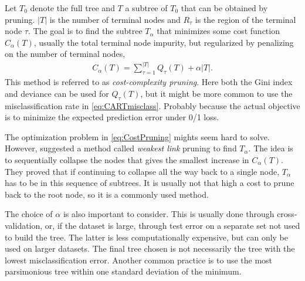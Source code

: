 Let $T_0$ denote the full tree and $T$ a subtree of $T_0$ that can be obtained by pruning. $|T|$ is the number of terminal nodes and $R_{\tau}$ is the region of the terminal node $\tau$. The goal is to find the subtree $T_\alpha$ that minimizes some cost function $C_\alpha (T)$, usually the total terminal node impurity, but regularized by penalizing on the number of terminal nodes,
\begin{align}
  \label{eq:CostPruning} 
  C_\alpha (T) = \sum_{\tau = 1}^{|T|} Q_\tau (T) + \alpha |T|. 
\end{align}
This method is referred to as \textit{cost-complexity pruning}.
Here both the Gini index and deviance can be used for $Q_\tau (T)$, but it might be more common to use the misclassification rate in \eqref{eq:CARTmisclass}. Probably because the actual objective is to minimize the expected prediction error under 0/1 loss.

The optimization problem in \eqref{eq:CostPruning} mights seem hard to solve. However, \cite{breiman} suggested a method called \textit{weakest link} pruning to find $T_\alpha$. The idea is to sequentially collapse the nodes that gives the smallest increase in $C_\alpha(T)$.
They proved that if continuing to collapse all the way back to a single node, $T_\alpha$ has to be in this sequence of subtrees. It is usually not that high a cost to prune back to the root node, so it is a commonly used method.

The choice of $\alpha$ is also important to consider. This is usually done through cross-validation, or, if the dataset is large, through test error on a separate set not used to build the tree. The latter is less computationally expensive, but can only be used on larger datasets. 
The final tree chosen is not necessarily the tree with the lowest misclassification error. Another common practice is to use the most parsimonious tree within one standard deviation of the minimum.


